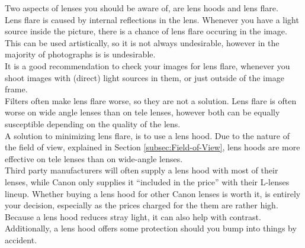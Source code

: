 Two aspects of lenses you should be aware of, are lens hoods and lens flare.
\\[\baselineskip]
Lens flare is caused by internal reflections in the lens. Whenever you have a light source inside the picture, there is a chance of lens flare occuring in the image. This can be used artistically, so it is not always undesirable, however in the majority of photographs is is undesirable.
\\
It is a good recommendation to check your images for lens flare, whenever you shoot images with (direct) light sources in them, or just outside of the image frame.
\\
Filters often make lens flare worse, so they are not a solution. Lens flare is often worse on wide angle lenses than on tele lenses, however both can be equally susceptible depending on the quality of the lens.
\\[\baselineskip]
A solution to minimizing lens flare, is to use a lens hood. Due to the nature of the field of view, explained in Section \ref{subsec:Field-of-View}, lens hoods are more effective on tele lenses than on wide-angle lenses.
\\
Third party manufacturers will often supply a lens hood with most of their lenses, while Canon only supplies it ``included in the price'' with their L-lenses lineup. Whether buying a lens hood for other Canon lenses is worth it, is entirely your decision, especially as the prices charged for the them are rather high.
\\
Because a lens hood reduces stray light, it can also help with contrast. Additionally, a lens hood offers some protection should you bump into things by accident.